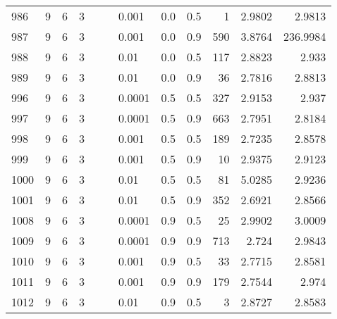 \begin{longtable}{lrrrrrlrrrrr}
  986 &       9 & 6 & 3 &   &   &                       0.001 &      0.0 &    0.5 &       1 &                 2.9802 &                 2.9813 \\
  987 &       9 & 6 & 3 &   &   &                       0.001 &      0.0 &    0.9 &     590 &                 3.8764 &               236.9984 \\
  988 &       9 & 6 & 3 &   &   &                        0.01 &      0.0 &    0.5 &     117 &                 2.8823 &                  2.933 \\
  989 &       9 & 6 & 3 &   &   &                        0.01 &      0.0 &    0.9 &      36 &                 2.7816 &                 2.8813 \\
  996 &       9 & 6 & 3 &   &   &                      0.0001 &      0.5 &    0.5 &     327 &                 2.9153 &                  2.937 \\
  997 &       9 & 6 & 3 &   &   &                      0.0001 &      0.5 &    0.9 &     663 &                 2.7951 &                 2.8184 \\
  998 &       9 & 6 & 3 &   &   &                       0.001 &      0.5 &    0.5 &     189 &                 2.7235 &                 2.8578 \\
  999 &       9 & 6 & 3 &   &   &                       0.001 &      0.5 &    0.9 &      10 &                 2.9375 &                 2.9123 \\
 1000 &       9 & 6 & 3 &   &   &                        0.01 &      0.5 &    0.5 &      81 &                 5.0285 &                 2.9236 \\
 1001 &       9 & 6 & 3 &   &   &                        0.01 &      0.5 &    0.9 &     352 &                 2.6921 &                 2.8566 \\
 1008 &       9 & 6 & 3 &   &   &                      0.0001 &      0.9 &    0.5 &      25 &                 2.9902 &                 3.0009 \\
 1009 &       9 & 6 & 3 &   &   &                      0.0001 &      0.9 &    0.9 &     713 &                  2.724 &                 2.9843 \\
 1010 &       9 & 6 & 3 &   &   &                       0.001 &      0.9 &    0.5 &      33 &                 2.7715 &                 2.8581 \\
 1011 &       9 & 6 & 3 &   &   &                       0.001 &      0.9 &    0.9 &     179 &                 2.7544 &                  2.974 \\
 1012 &       9 & 6 & 3 &   &   &                        0.01 &      0.9 &    0.5 &       3 &                 2.8727 &                 2.8583 \\

\end{longtable}
